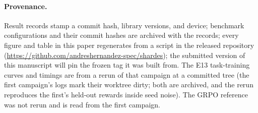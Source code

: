 \paragraph{Provenance.} Result records stamp a commit hash, library versions,
and device; benchmark configurations and their commit hashes are archived with
the records; every figure and table in this paper regenerates from a script in
the released repository
(\url{https://github.com/andreshernandez-spec/shardes}); the submitted
version of this manuscript will pin the frozen tag it was built from.
The E13 task-training curves and timings are from a rerun of that campaign
at a committed tree (the first campaign's logs mark their worktree dirty;
both are archived, and the rerun reproduces the first's held-out rewards
inside seed noise). The GRPO reference was not rerun and is read from the
first campaign.
